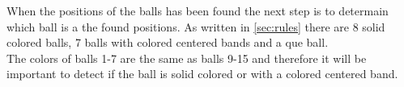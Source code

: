 When the positions of the balls has been found the next step is to determain which ball is a the found positions. As written in \ref{sec:rules} there are 8 solid colored balls, 7 balls with colored centered bands and a que ball.\\

The colors of balls 1-7 are the same as balls 9-15 and therefore it will be important to detect if the ball is solid colored or with a colored centered band.